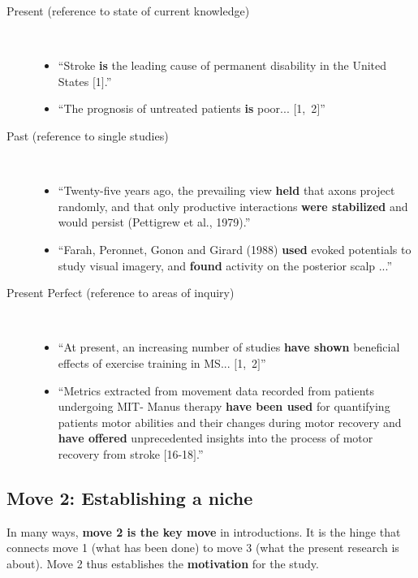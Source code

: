 	\begin{description}	
		\item[Present (reference to state of current knowledge)] \hfill \\
		\begin{itemize}
			\item ``Stroke \textbf{is} the leading cause of permanent disability in the United States $[$1$]$.''
			\item ``The prognosis of untreated patients \textbf{is} poor... $[$1,~2$]$''
		\end{itemize}
		\item[Past (reference to single studies)] \hfill \\
		\begin{itemize}
			\item ``Twenty-five years ago, the prevailing view \textbf{held} that axons project randomly, and that only productive interactions \textbf{were stabilized} and would persist (Pettigrew et al., 1979).''
			\item ``Farah, Peronnet, Gonon and Girard (1988) \textbf{used} evoked potentials to study visual imagery, and \textbf{found} activity on the posterior scalp ...''
		\end{itemize}
		\item[Present Perfect (reference to areas of inquiry)] \hfill \\ 
		\begin{itemize}
			\item ``At present, an increasing number of studies \textbf{have shown} beneficial effects of exercise training in MS... $[$1,~2$]$''
			\item ``Metrics extracted from movement data recorded from patients undergoing MIT- Manus therapy \textbf{have been used} for quantifying patients motor abilities and their changes during motor recovery and \textbf{have offered} unprecedented insights into the process of motor recovery from stroke $[$16-18$]$.''
		\end{itemize}
	\end{description}

\subsection{Move 2: Establishing a niche}

In many ways, \textbf{move 2 is the key move} in introductions. It is the hinge that connects move 1 (what has been done) to move 3 (what the present research is about). Move 2 thus establishes the \textbf{motivation} for the study.

